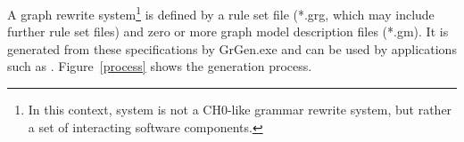 
A graph rewrite system\footnote{In this context, system is not a CH0-like grammar rewrite system, but rather a set of interacting software components.}
is defined by a rule set file (*.grg, which may include further rule set files) and zero or more graph model description files (*.gm).
It is generated from these specifications by GrGen.exe and can be used by applications such as \GrShell.
Figure~\ref{process} shows the generation process.

